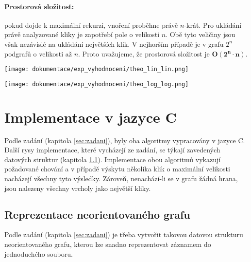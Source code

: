 \documentclass[a4paper]{article}
\begin{document}
            \paragraph{Prostorová složitost:} pokud dojde k maximální rekurzi, vnoření proběhne právě $n$-krát. Pro ukládání právě analyzované kliky je zapotřebí pole o velikosti $n$. Obě tyto veličiny jsou však nezávislé na ukládání největších klik. V nejhorším případě je v grafu $2^n$ podgrafů o velikosti až $n$. Proto uvažujeme, že prostorová složitost je $\mathbf{O(2^n \cdot n)}.$ 

    \begin{minipage}{.5\textwidth}
        \centering
        \texttt{[image: dokumentace/exp\_vyhodnoceni/theo\_lin\_lin.png]}
        \label{fig:complx_theo_linlin}
    \end{minipage}
    \begin{minipage}{.5\textwidth}
        \centering
        \texttt{[image: dokumentace/exp\_vyhodnoceni/theo\_log\_log.png]}
        \label{fig:complx_theo_loglog}
    \end{minipage}
    

\section{Implementace v jazyce C}  \label{sec:implem}
    Podle zadání (kapitola \ref{sec:zadani}), byly oba algoritmy vypracovány v jazyce C. Další rysy implementace, které vycházejí ze zadání, se týkají zavedených datových struktur (kapitola \ref{subsec:graph_imp}). Implementace obou algoritmů vykazují požadované chování a v případě výskytu několika klik o maximální velikosti nacházejí všechny tyto výsledky. Zároveň, nenachází-li se v grafu žádná hrana, jsou nalezeny všechny vrcholy jako největší kliky.\\

    \subsection{Reprezentace neorientovaného grafu} \label{subsec:graph_imp}
        Podle zadání (kapitola \ref{sec:zadani}) je třeba vytvořit takovou datovou strukturu neorientovaného grafu, kterou lze snadno reprezentovat záznamem do jednoduchého souboru.\\
\end{document}
